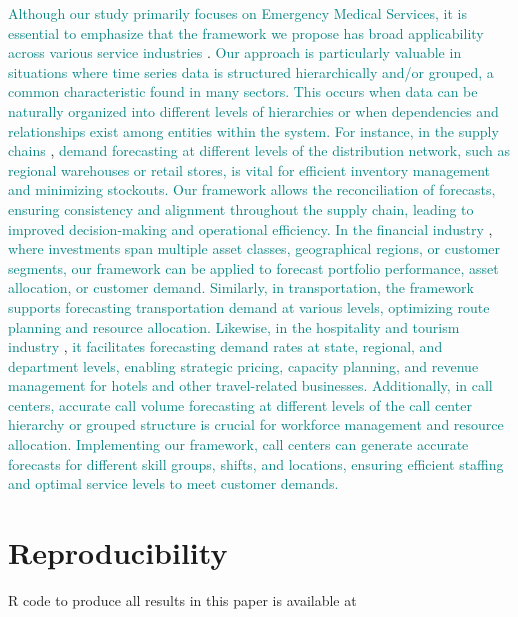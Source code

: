 \documentclass[
  authoryear,
  preprint,
  3p]{elsarticle}
\begin{document}
\textcolor{teal}{Although our study primarily focuses on Emergency Medical Services, it is essential to emphasize that the framework we propose has broad applicability across various service industries}
\citep{ostrom2010moving}.
\textcolor{teal}{Our approach is particularly valuable in situations where time series data is structured hierarchically and/or grouped, a common characteristic found in many sectors. This occurs when data can be naturally organized into different levels of hierarchies or when dependencies and relationships exist among entities within the system. For instance, in the supply chains }
\citep{shugan2000advance},
\textcolor{teal}{demand forecasting at different levels of the distribution network, such as regional warehouses or retail stores, is vital for efficient inventory management and minimizing stockouts. Our framework allows the reconciliation of forecasts, ensuring consistency and alignment throughout the supply chain, leading to improved decision-making and operational efficiency. In the financial industry}
\citep{kimes1998strategic},
\textcolor{teal}{where investments span multiple asset classes, geographical regions, or customer segments, our framework can be applied to forecast portfolio performance, asset allocation, or customer demand. Similarly, in transportation, the framework supports forecasting transportation demand at various levels, optimizing route planning and resource allocation. Likewise, in the hospitality and tourism industry}
\citep{dekimpe2016impact},
\textcolor{teal}{it facilitates forecasting demand rates at state, regional, and department levels, enabling strategic pricing, capacity planning, and revenue management for hotels and other travel-related businesses. Additionally, in call centers, accurate call volume forecasting at different levels of the call center hierarchy or grouped structure is crucial for workforce management and resource allocation. Implementing our framework, call centers can generate accurate forecasts for different skill groups, shifts, and locations, ensuring efficient staffing and optimal service levels to meet customer demands.}

\hypertarget{reproducibility}{%
\section*{Reproducibility}\label{reproducibility}}

R code to produce all results in this paper is available at


\renewcommand\refname{References}
  
\end{document}
